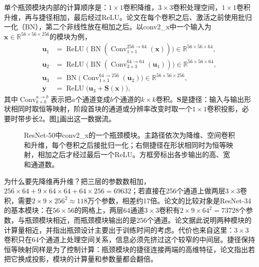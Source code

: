 单个瓶颈模块内部的计算顺序是：$1\times1$卷积降维，$3\times3$卷积处理空间，$1\times1$卷积升维，再与捷径相加，最后经过ReLU。论文在每个卷积之后、激活之前使用批归一化（BN），第二个非线性放在相加之后。以conv2\_x中一个输入为$\bm x\in\mathbb R^{56\times56\times256}$的模块为例，
\begin{equation}
  \begin{aligned}
    \bm u_1&=\operatorname{ReLU}\bigl(\operatorname{BN}(\operatorname{Conv}_{1\times1}^{256\to64}(\bm x))\bigr)\in\mathbb R^{56\times56\times64},\\
    \bm u_2&=\operatorname{ReLU}\bigl(\operatorname{BN}(\operatorname{Conv}_{3\times3}^{64\to64}(\bm u_1))\bigr)\in\mathbb R^{56\times56\times64},\\
    \bm u_3&=\operatorname{BN}\bigl(\operatorname{Conv}_{1\times1}^{64\to256}(\bm u_2)\bigr)\in\mathbb R^{56\times56\times256},\\
    \bm y&=\operatorname{ReLU}\bigl(\bm u_3+\bm S(\bm x)\bigr),
  \end{aligned}
  \label{eq:vision-ivm-bottleneck}
\end{equation}
其中$\operatorname{Conv}_{k\times k}^{a\to b}$表示把$a$个通道变成$b$个通道的$k\times k$卷积。$\bm S$是捷径：输入与输出形状相同时取恒等映射，阶段首块的通道或分辨率改变时取一个$1\times1$卷积投影，必要时带步长2。图\ref{fig:vision-ivm-resnet-bottleneck}画出这一数据流。

\begin{figure}[htbp]
  \centering
  
  \caption{ResNet-50中conv2\_x的一个瓶颈模块。主路径依次为降维、空间卷积和升维，每个卷积之后接批归一化；右侧捷径在形状相同时为恒等映射，相加之后才经过最后一个ReLU。方框旁标出各步输出的高、宽和通道数。}
  \label{fig:vision-ivm-resnet-bottleneck}
\end{figure}

为什么要先降维再升维？把三层的参数数相加，$256\times64+9\times64\times64+64\times256=69632$；若直接在256个通道上做两层$3\times3$卷积，需要$2\times9\times256^2\approx118$万个参数，相差约17倍。论文的比较对象是ResNet-34的基本模块：在$56\times56$的网格上，两层64通道$3\times3$卷积有$2\times9\times64^2=73728$个参数，与瓶颈模块相近，而瓶颈模块输出的是256个通道。论文据此说明两种模块的计算量相近，并指出瓶颈设计主要出于训练时间的考虑。代价也来自这里：$3\times3$卷积只在64个通道上处理空间关系，信息必须先挤过这个较窄的中间层。捷径保持恒等映射同样是为了控制计算：瓶颈模块的捷径连接两端的高维特征，论文指出若把它换成投影，模块的计算量和参数量都会翻倍。

